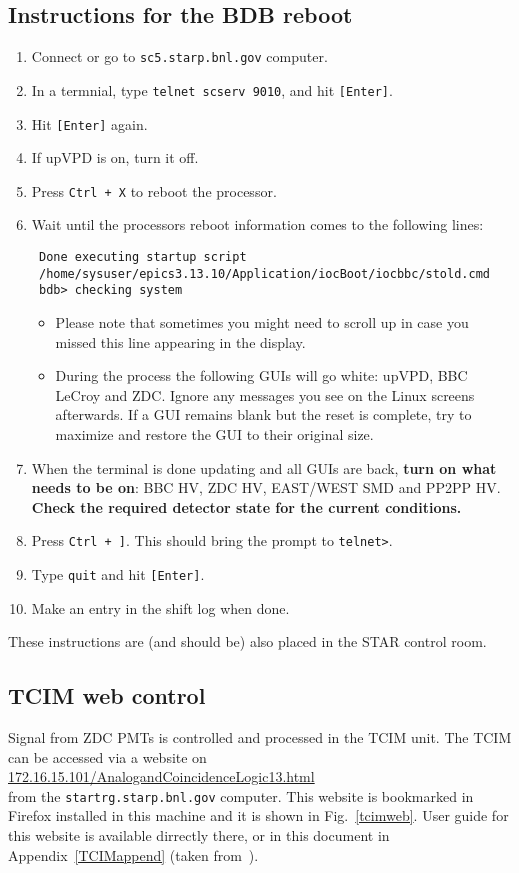 \subsection{Instructions for the BDB reboot}
\label{bdbreboot}

\begin{enumerate}
\item Connect or go to \texttt{sc5.starp.bnl.gov} computer.
\item In a termnial, type \texttt{telnet scserv 9010}, and hit \texttt{[Enter]}.
\item Hit  \texttt{[Enter]} again.
\item If upVPD is on, turn it off.
\item Press \texttt{Ctrl + X} to reboot the processor.
\item Wait until the processors reboot information comes to the following lines:
\noindent
\begin{verbatim}
 Done executing startup script
 /home/sysuser/epics3.13.10/Application/iocBoot/iocbbc/stold.cmd
 bdb> checking system
\end{verbatim}

\begin{itemize}
 \item Please note that sometimes you might need to scroll up in case you missed this line appearing in the display.
 \item During the process the following GUIs will go white: upVPD, BBC LeCroy and ZDC\@. Ignore any messages you see on the Linux screens afterwards. If a GUI remains blank but the reset is complete, try to maximize and restore the GUI to their original size.
\end{itemize}

\item When the terminal is done updating and all GUIs are back, \textbf{turn on what needs to be on}: BBC HV, ZDC HV, EAST/WEST SMD and PP2PP HV\@. \textbf{Check the required detector state for the current conditions.}
\item Press \texttt{Ctrl + ]}. This should bring the prompt to \texttt{telnet>}.
\item Type \texttt{quit} and hit \texttt{[Enter]}.
\item Make an entry in the shift log when done.
\end{enumerate}

These instructions are (and should be) also placed in the STAR control room.

\subsection{TCIM web control}
Signal from ZDC PMTs is controlled and processed in the TCIM unit. The TCIM can be accessed via a website on\\
\url{172.16.15.101/AnalogandCoincidenceLogic13.html}\\
from the \texttt{startrg.starp.bnl.gov} computer. This website is bookmarked in Firefox installed in this machine and it is shown in Fig.~\ref{tcimweb}. User guide for this website is available dirrectly there, or in this document in Appendix~\ref{TCIMappend} (taken from~\cite{tcim}).

